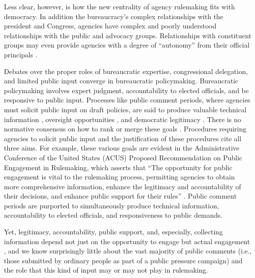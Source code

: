 Less clear, however, is how the new centrality of agency rulemaking fits with democracy. In addition the bureaucracy's complex relationships with the president and Congress, agencies have complex and poorly understood relationships with the public and advocacy groups. Relationships with constituent groups may even provide agencies with a degree of ``autonomy'' from their official principals \citep{Carpenter2001}. %

Debates over the proper roles of bureaucratic expertise, congressional delegation, and limited public input converge in bureaucratic policymaking. Bureaucratic policymaking involves expert judgment, accountability to elected officials, and be responsive to public input. %
Processes like public comment periods, where agencies must solicit public input on draft policies, are said to produce valuable technical information \citep{Yackee2006JPART, Nelson2012}, oversight opportunities \citep{Balla1998, Mccubbins1984}, and democratic legitimacy \citep{Croley2003, Rosenbloom2003}. There is no normative consensus on how to rank or merge these goals \citep{Wilson1967, Wilson1989, Carrigan2017}. Procedures requiring agencies to solicit public input and the justification of these procedures cite all three aims. For example, these various goals are evident in the Administrative Conference of the United States (ACUS) Proposed Recommendation on Public Engagement in Rulemaking, which asserts that ``The opportunity for public engagement is vital to the rulemaking process, permitting agencies to obtain more comprehensive information, enhance the legitimacy and accountability of their decisions, and enhance public support for their rules'' \citep{ACUS2018}. Public comment periods are purported to simultaneously produce technical information, accountability to elected officials, and responsiveness to public demands.

Yet, legitimacy, accountability, public support, and, especially, collecting information depend not just on the opportunity to engage but actual engagement \citep{Herz2018}, and we know surprisingly little about the vast majority of public comments (i.e., those submitted by ordinary people as part of a public pressure campaign) and the role that this kind of input may or may not play in rulemaking.


